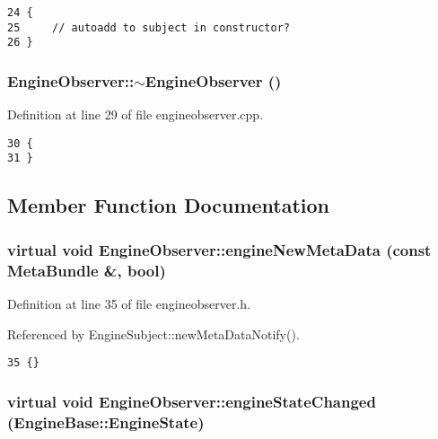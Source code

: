 \footnotesize\begin{verbatim}24 {
25     // autoadd to subject in constructor?
26 }
\end{verbatim}\normalsize 
{}
\subsubsection{\setlength{\rightskip}{0pt plus 5cm}Engine\-Observer::$\sim${\bf Engine\-Observer} ()\hspace{0.3cm}{\tt  [virtual]}}\label{classEngineObserver_EngineObservera1}




Definition at line 29 of file engineobserver.cpp.



\footnotesize\begin{verbatim}30 {
31 }
\end{verbatim}\normalsize 


\subsection{Member Function Documentation}
\subsubsection{\setlength{\rightskip}{0pt plus 5cm}virtual void Engine\-Observer::engine\-New\-Meta\-Data (const {\bf Meta\-Bundle} \&, bool)\hspace{0.3cm}{\tt  [inline, virtual]}}\label{classEngineObserver_EngineObservera3}




Definition at line 35 of file engineobserver.h.

Referenced by Engine\-Subject::new\-Meta\-Data\-Notify().



\footnotesize\begin{verbatim}35 {}
\end{verbatim}\normalsize 
{}
\subsubsection{\setlength{\rightskip}{0pt plus 5cm}virtual void Engine\-Observer::engine\-State\-Changed ({\bf Engine\-Base::Engine\-State})\hspace{0.3cm}{\tt  [inline, virtual]}}\label{classEngineObserver_EngineObservera2}




